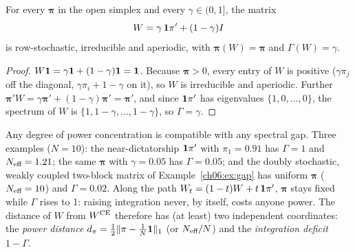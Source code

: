 \documentclass[../structural_economics_book.tex]{subfiles}
\begin{document}
\begin{proposition}\label{ch06:prop:gap-power-independent}
For every $\boldsymbol{\pi}$ in the open simplex and every $\gamma \in (0, 1]$, the matrix
\begin{equation}
W = \gamma\,\mathbf{1}\pi' + (1-\gamma)I
\end{equation}
is row-stochastic, irreducible and aperiodic, with $\boldsymbol{\pi}(W) = \boldsymbol{\pi}$ and $\Gamma(W) = \gamma$.
\end{proposition}

\begin{proof}
$W\mathbf{1} = \gamma\mathbf{1} + (1-\gamma)\mathbf{1} = \mathbf{1}$. Because $\boldsymbol{\pi} > 0$, every entry of $W$ is positive ($\gamma\pi_j$ off the diagonal, $\gamma\pi_i + 1 - \gamma$ on it), so $W$ is irreducible and aperiodic. Further $\boldsymbol{\pi}'W = \gamma\boldsymbol{\pi}' + (1-\gamma)\boldsymbol{\pi}' = \boldsymbol{\pi}'$, and since $\mathbf{1}\pi'$ has eigenvalues $\{1, 0, \ldots, 0\}$, the spectrum of $W$ is $\{1, 1-\gamma, \ldots, 1-\gamma\}$, so $\Gamma = \gamma$.
\end{proof}

Any degree of power concentration is compatible with any spectral gap. Three examples ($N = 10$): the near-dictatorship $\mathbf{1}\pi'$ with $\pi_1 = 0.91$ has $\Gamma = 1$ and $N_{\text{eff}} = 1.21$; the same $\boldsymbol{\pi}$ with $\gamma = 0.05$ has $\Gamma = 0.05$; and the doubly stochastic, weakly coupled two-block matrix of Example~\ref{ch06:ex:gap} has uniform $\boldsymbol{\pi}$ ($N_{\text{eff}} = 10$) and $\Gamma = 0.02$. Along the path $W_t = (1-t)W + t\,\mathbf{1}\pi'$, $\boldsymbol{\pi}$ stays fixed while $\Gamma$ rises to 1: raising integration never, by itself, costs anyone power. The distance of $W$ from $W^{\text{CE}}$ therefore has (at least) two independent coordinates: the \textit{power distance} $d_\pi = \frac12\|\pi - \frac1N\mathbf{1}\|_1$ (or $N_{\text{eff}}/N$) and the \textit{integration deficit} $1 - \Gamma$.
\end{document}
